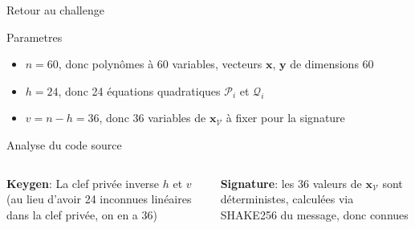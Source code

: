 \begin{frame}{Retour au challenge}
    \begin{block}{Parametres}
        \begin{itemize}
            \item $n=60$, donc polynômes à 60 variables, vecteurs $\mathbf{x}$, $\mathbf{y}$ de dimensions 60 
            \item $h=24$, donc 24 équations quadratiques $\mathcal{P}_i$ et $\mathcal{Q}_i$
            \item $v=n-h=36$, donc 36 variables de $\mathbf{x}_\mathcal{V}$ à fixer pour la signature
        \end{itemize}
    \end{block}

\pause
\vspace{0.6cm}

    \begin{outline}
        \1 Analyse du code source
    \end{outline}

            \begin{columns}
                \begin{tcolorbox}
                    \begin{minipage}{\columnwidth}
    \textbf{Keygen}: La clef privée inverse $h$ et $v$ (au lieu d'avoir 24 inconnues linéaires dans la clef privée, on en a 36)
                    \end{minipage}%
                \end{tcolorbox}
                \pause

                \begin{tcolorbox}
                    \begin{minipage}{\columnwidth}
    \textbf{Signature}: les 36 valeurs de $\mathbf{x}_\mathcal{V}$ sont déterministes, calculées via SHAKE256 du message, donc connues
                    \end{minipage}%
                \end{tcolorbox}

            \end{columns}       
\end{frame}

\newcommand{\vin}{\mathcal{V}}
\newcommand{\hui}{\mathcal{H}}
\renewcommand{\S}{{\mathcal{S}}}
\newcommand{\sV}{{\mathcal{S}_{|\vin}}}
\newcommand{\sH}{{\mathcal{S}_{|\hui}}}

